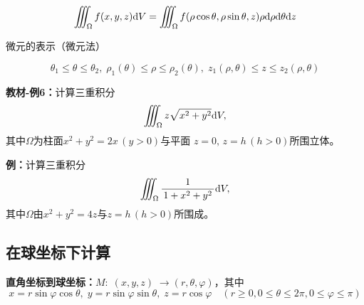 $${\iiint_{\Omega}f(x,y,z)\mathrm{d}
V=\iiint_{\Omega}f(\rho\cos\theta,\rho\sin\theta,z)\rho 
\mathrm{d}\rho \mathrm{d}\theta \mathrm{d} z}$$

微元的表示（微元法）

\begin{center}
\end{center}

$$\theta_1\leq\theta\leq\theta_2,\;
\rho_1(\theta)\leq\rho\leq\rho_2(\theta),\;
z_1(\rho,\theta)\leq z\leq z_2(\rho,\theta)$$

{\bf 教材-例6：}计算三重积分
$$\iiint_{\Omega}z\sqrt{x^2+y^2}\mathrm{d} V,$$
其中$\Omega$为柱面$x^2+y^2=2x\,(y>0)$与平面
$z=0,\,z=h\,(h>0)$所围立体。

{\bf 例：}计算三重积分
$$\iiint_{\Omega}\displaystyle\frac{\,{1}\,}{\,{1+x^2+y^2}\,}\mathrm{d} V,$$
其中$\Omega$由$x^2+y^2=4z$与$z=h\,(h>0)$所围成。

\subsection{在球坐标下计算}

{\bf 直角坐标到球坐标：}$M:\;(x,y,z)\;\to(r,\theta,\varphi)$，其中
$$x=r\sin\varphi\cos\theta,\;y=r\sin\varphi\sin\theta,\;z=r\cos\varphi
\quad(r\geq 0,0\leq\theta\leq 2\pi,0\leq\varphi\leq\pi)$$

